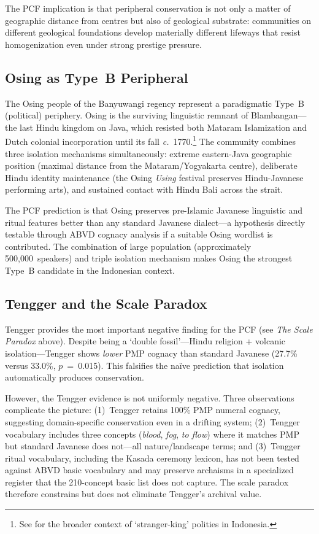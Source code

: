 \documentclass[12pt,a4paper]{article}
\begin{document}
The PCF implication is that peripheral conservation is not only a matter of geographic distance from centres but also of geological substrate: communities on different geological foundations develop materially different lifeways that resist homogenization even under strong prestige pressure.

\subsection{Osing as Type~B Peripheral}

The Osing people of the Banyuwangi regency represent a paradigmatic Type~B (political) periphery. Osing is the surviving linguistic remnant of Blambangan---the last Hindu kingdom on Java, which resisted both Mataram Islamization and Dutch colonial incorporation until its fall \textit{c.}~1770.\footnote{See \autocite{henley2004trousers} for the broader context of `stranger-king' polities in Indonesia.} The community combines three isolation mechanisms simultaneously: extreme eastern-Java geographic position (maximal distance from the Mataram/Yogyakarta centre), deliberate Hindu identity maintenance (the Osing \emph{Using} festival preserves Hindu-Javanese performing arts), and sustained contact with Hindu Bali across the strait.

The PCF prediction is that Osing preserves pre-Islamic Javanese linguistic and ritual features better than any standard Javanese dialect---a hypothesis directly testable through ABVD cognacy analysis if a suitable Osing wordlist is contributed. The combination of large population (approximately 500,000~speakers) and triple isolation mechanism makes Osing the strongest Type~B candidate in the Indonesian context.

\subsection{Tengger and the Scale Paradox}

Tengger provides the most important negative finding for the PCF (see \emph{The Scale Paradox} above). Despite being a `double fossil'---Hindu religion + volcanic isolation---Tengger shows \emph{lower} PMP cognacy than standard Javanese (27.7\% versus 33.0\%, $p$~=~0.015). This falsifies the na\"ive prediction that isolation automatically produces conservation.

However, the Tengger evidence is not uniformly negative. Three observations complicate the picture: (1)~Tengger retains 100\% PMP numeral cognacy, suggesting domain-specific conservation even in a drifting system; (2)~Tengger vocabulary includes three concepts (\emph{blood}, \emph{fog}, \emph{to flow}) where it matches PMP but standard Javanese does not---all nature/landscape terms; and (3)~Tengger ritual vocabulary, including the Kasada ceremony lexicon, has not been tested against ABVD basic vocabulary and may preserve archaisms in a specialized register that the 210-concept basic list does not capture. The scale paradox therefore constrains but does not eliminate Tengger's archival value.
\end{document}
